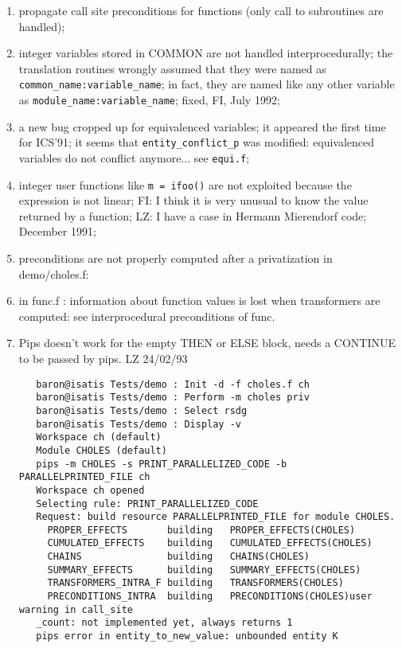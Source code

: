 \begin{enumerate}
  \item propagate call site preconditions for functions (only call to
        subroutines are handled);

  \item integer variables stored in COMMON are not handled interprocedurally;
        the translation routines wrongly assumed that they were named as
        \verb+common_name:variable_name+; in fact, they are named like
        any other variable as \verb+module_name:variable_name+; fixed,
        FI, July 1992;

  \item a new bug cropped up for equivalenced variables; it appeared
        the first time for ICS'91; it seems that \verb+entity_conflict_p+
        was modified: equivalenced variables do not conflict anymore...
        see \verb+equi.f+;

  \item integer user functions like {\tt m = ifoo()} are not exploited because 
        the expression is not linear; FI: I think it is very unusual to
        know the value returned by a function; LZ: I have a case in
        Hermann Mierendorf code; December 1991;

  \item preconditions are not properly computed after a privatization
        in demo/choles.f:

  \item in func.f : information about function values is lost when
        transformers are computed: see interprocedural preconditions of func.

  \item Pips doesn't work for the empty THEN or ELSE block, needs a
        CONTINUE to be passed by pips. LZ 24/02/93

\begin{verbatim}
   baron@isatis Tests/demo : Init -d -f choles.f ch
   baron@isatis Tests/demo : Perform -m choles priv
   baron@isatis Tests/demo : Select rsdg
   baron@isatis Tests/demo : Display -v
   Workspace ch (default)
   Module CHOLES (default)
   pips -m CHOLES -s PRINT_PARALLELIZED_CODE -b PARALLELPRINTED_FILE ch
   Workspace ch opened
   Selecting rule: PRINT_PARALLELIZED_CODE
   Request: build resource PARALLELPRINTED_FILE for module CHOLES.
     PROPER_EFFECTS       building   PROPER_EFFECTS(CHOLES)
     CUMULATED_EFFECTS    building   CUMULATED_EFFECTS(CHOLES)
     CHAINS               building   CHAINS(CHOLES)
     SUMMARY_EFFECTS      building   SUMMARY_EFFECTS(CHOLES)
     TRANSFORMERS_INTRA_F building   TRANSFORMERS(CHOLES)
     PRECONDITIONS_INTRA  building   PRECONDITIONS(CHOLES)user warning in call_site
   _count: not implemented yet, always returns 1
   pips error in entity_to_new_value: unbounded entity K
\end{verbatim}


\end{enumerate}
